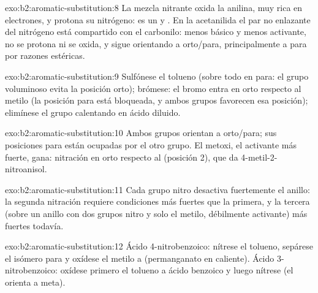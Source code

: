 \begin{solution}{exo:b2:aromatic-substitution:8}
La mezcla nitrante oxida la anilina, muy rica en electrones, y protona su nitrógeno:
 es un  y . En la acetanilida el par no enlazante del nitrógeno está
compartido con el carbonilo: menos básico y menos activante, no se protona ni se oxida,
y sigue orientando a orto/para, principalmente a para por razones estéricas.
\end{solution}

\begin{solution}{exo:b2:aromatic-substitution:9}
Sulfónese el tolueno (sobre todo en para: el grupo voluminoso evita la posición orto); brómese: el bromo entra
en orto respecto al metilo (la posición para está bloqueada, y ambos grupos favorecen esa posición);
elimínese el grupo  calentando en ácido diluido.
\end{solution}

\begin{solution}{exo:b2:aromatic-substitution:10}
Ambos grupos orientan a orto/para; sus posiciones para están ocupadas por el otro grupo. El metoxi, el
activante más fuerte, gana: nitración en orto respecto al  (posición 2), que da
4-metil-2-nitroanisol.
\end{solution}

\begin{solution}{exo:b2:aromatic-substitution:11}
Cada grupo nitro desactiva fuertemente el anillo: la segunda nitración requiere condiciones más fuertes
que la primera, y la tercera (sobre un anillo con dos grupos nitro y solo el metilo, débilmente
activante) más fuertes todavía.
\end{solution}

\begin{solution}{exo:b2:aromatic-substitution:12}
Ácido 4-nitrobenzoico: nítrese el tolueno, sepárese el isómero para y oxídese el metilo a
 (permanganato en caliente). Ácido 3-nitrobenzoico: oxídese primero el tolueno a ácido benzoico y luego
nítrese (el  orienta a meta).
\end{solution}

